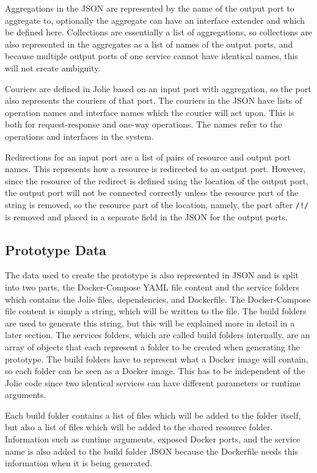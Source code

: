 Aggregations in the JSON are represented by the name of the output port to aggregate to, optionally the aggregate can have an interface extender and which be defined here.
Collections are essentially a list of aggregations, so collections are also represented in the aggregates as a list of names of the output ports, and because multiple output ports of one service cannot have identical names, this will not create ambiguity.

Couriers are defined in Jolie based on an input port with aggregation, so the port also represents the couriers of that port.
The couriers in the JSON have lists of operation names and interface names which the courier will act upon. This is both for request-response and one-way operations. The names refer to the operations and interfaces in the system.

Redirections for an input port are a list of pairs of resource and output port names. This represents how a resource is redirected to an output port.
However, since the resource of the redirect is defined using the location of the output port, the output port will not be connected correctly unless the resource part of the string is removed, so the resource part of the location, namely,
the part after \texttt{/!/} is removed and placed in a separate field in the JSON for the output ports.

\subsection{Prototype Data}
The data used to create the prototype is also represented in JSON and is split into two parts, the Docker-Compose YAML file content and the service folders which contains the Jolie files, dependencies, and Dockerfile.
The Docker-Compose file content is simply a string, which will be written to the file. The build folders are used to generate this string, but this will be explained more in detail in a later section.
The services folders, which are called build folders internally, are an array of objects that each represent a folder to be created when generating the prototype.
The build folders have to represent what a Docker image will contain, so each folder can be seen as a Docker image. This has to be independent of the Jolie code since two identical services can have different parameters or runtime arguments.

Each build folder contains a list of files which will be added to the folder itself, but also a list of files which will be added to the shared resource folder.
Information such as runtime arguments, exposed Docker ports, and the service name is also added to the build folder JSON because the Dockerfile needs this information when it is being generated.

